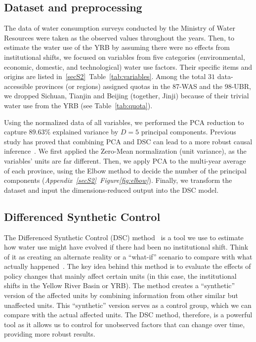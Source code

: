 \subsection{Dataset and preprocessing}\label{sec:dataset}
The data of water consumption surveys conducted by the Ministry of Water Resources were taken as the observed values throughout the years.
Then, to estimate the water use of the YRB by assuming there were no effects from institutional shifts, we focused on variables from five categories (environmental, economic, domestic, and technological) water use factors. Their specific items and origins are listed in~\ref{secS2}~Table~\ref{tab:variables}.
Among the total $31$ data-accessible provinces (or regions) assigned quotas in the 87-WAS and the 98-UBR, we dropped Sichuan, Tianjin and Beijing (together, Jinji) because of their trivial water use from the YRB (see Table~\ref{tab:quota}).

Using the normalized data of all variables, we performed the PCA reduction to capture $89.63\%$ explained variance by $D = 5$ principal components.
Previous study has proved that combining PCA and DSC can lead to a more robust causal inference~\cite{bayani2021}.
We first applied the Zero-Mean normalization (unit variance), as the variables' units are far different. Then, we apply PCA to the multi-year average of each province, using the Elbow method to decide the number of the principal components (\textit{Appendix~\ref{secS2}~Figure\ref{fig:elbow}}).
Finally, we transform the dataset and input the dimensions-reduced output into the DSC model.

\subsection{Differenced Synthetic Control}\label{sec:DSC}

The Differenced Synthetic Control (DSC) method~\cite{arkhangelsky2021} is a tool we use to estimate how water use might have evolved if there had been no institutional shift.
Think of it as creating an alternate reality or a ``what-if'' scenario to compare with what actually happened~\cite{abadie2010, abadie2015, hill2021}.
The key idea behind this method is to evaluate the effects of policy changes that mainly affect certain units (in this case, the institutional shifts in the Yellow River Basin or YRB).
The method creates a ``synthetic'' version of the affected units by combining information from other similar but unaffected units. This ``synthetic'' version serves as a control group, which we can compare with the actual affected units.
The DSC method, therefore, is a powerful tool as it allows us to control for unobserved factors that can change over time, providing more robust results.

